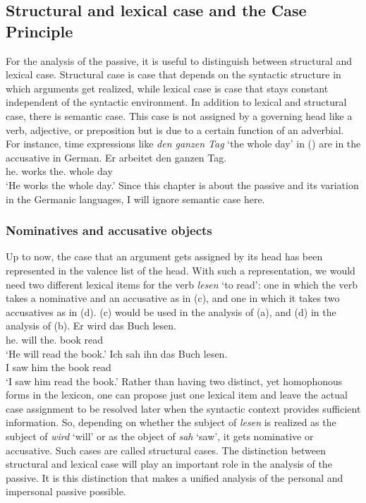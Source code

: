 \subsection{Structural and lexical case and the Case Principle}
\label{sec-struk-lex-kas}
\label{sec-struc-lex-kas}

For the analysis of the passive, it is useful to distinguish between structural and lexical
case. Structural case is case that depends on the syntactic structure in which arguments get
realized, while lexical case is case that stays constant independent of the syntactic environment. In
addition to lexical and structural case, there is semantic case. This case is not assigned by a
governing head like a verb, adjective, or preposition but is due to a certain function of an
adverbial. For instance, time expressions like \emph{den ganzen Tag} `the whole day' in () are
in the accusative in German.
\ea
\gll Er arbeitet den ganzen Tag.\\
     he.\NOM{} works the.\ACC{} whole day\\\german
\glt `He works the whole day.'
\z
Since this chapter is about the passive and its variation in the Germanic languages, I will ignore
semantic case here.

\subsubsection{Nominatives and accusative objects}

Up to now, the case that an argument gets assigned by its head has been represented in the valence list of
the head. With such a representation, we would need two different lexical items for the verb
\emph{lesen} `to read': one in which the verb takes a nominative and an accusative as in
(c), and one in which it takes two accusatives as in (d). (c) would be used in
the analysis of (a), and (d) in the analysis of (b).
\eal
\ex 
\gll Er        wird das        Buch lesen.\\
     he.\NOM{} will the.\ACC{} book read\\\german
\glt `He will read the book.'
\ex 
\gll Ich sah ihn das Buch lesen.\\
     I   saw him the book read\\
\glt `I saw him read the book.'
\ex {}
\ex {}
\zl
Rather than having two distinct, yet homophonous forms in the lexicon, one can propose just one lexical item and leave the actual
case assignment to be resolved later when the syntactic context provides sufficient information. So,
depending on whether the subject of \emph{lesen} is realized as the 
subject of \emph{wird} `will' or as the object of \emph{sah} `saw', it gets nominative or accusative. Such
cases are called structural cases. The distinction between structural and lexical case will play an
important role in the analysis of the passive. It is this distinction that makes a unified analysis of
the personal and impersonal passive possible.

